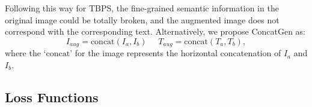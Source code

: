 \documentclass[letterpaper]{article} %
\begin{document}
Following this way for TBPS, the fine-grained semantic information in the original image could be totally broken, and the augmented image does not correspond with the corresponding text.
Alternatively, we propose ConcatGen as: 
\begin{equation}
    I_{aug} = \text{concat}(I_a, I_b) ~~~~~~
    T_{aug} = \text{concat}(T_a, T_b),
\end{equation}
where the `$\text{concat}$' for the image represents the horizontal concatenation of $I_a$ and $I_b$.
\fi



\subsection{Loss Functions} \label{sec:3.3}
\end{document}
